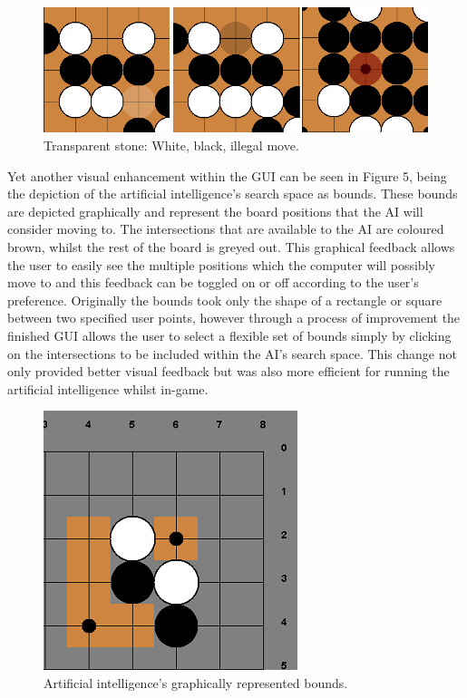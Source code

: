 \documentclass{l3proj}
\begin{document}
\begin{figure}[H]
\centering
\includegraphics[scale=0.7]{Images/GUI-4-Transparent.png}
\caption{Transparent stone: White, black, illegal move.}
\end{figure}

Yet another visual enhancement within the GUI can be seen in Figure 5, being the depiction of the artificial intelligence's search space as bounds. These bounds are depicted graphically and represent the board positions that the AI will consider moving to. The intersections that are available to the AI are coloured brown, whilst the rest of the board is greyed out. This graphical feedback allows the user to easily see the multiple positions which the computer will possibly move to and this feedback can be toggled on or off according to the user's preference. Originally the bounds took only the shape of a rectangle or square between two specified user points, however through a process of improvement the finished GUI allows the user to select a flexible set of bounds simply by clicking on the intersections to be included within the AI's search space. This change not only provided better visual feedback but was also more efficient for running the artificial intelligence whilst in-game.

\begin{figure}[H]
\centering
\includegraphics[scale=1]{Images/GUI-5-Bounds.png}
\caption{Artificial intelligence's graphically represented bounds.}
\end{figure}
\end{document}
